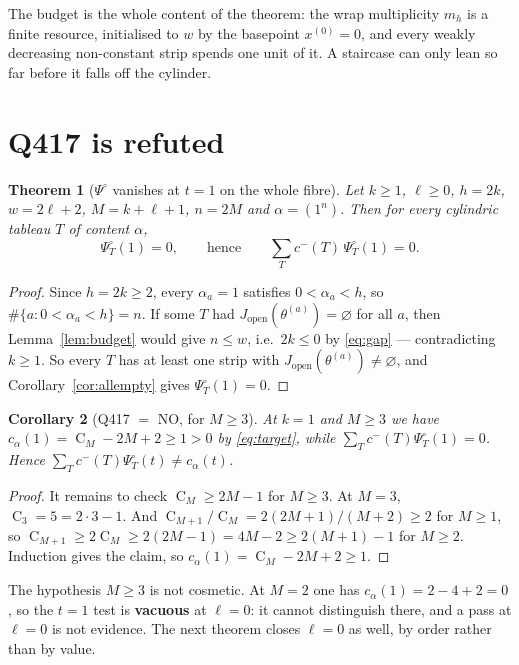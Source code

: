 \documentclass[11pt]{article}
\theoremstyle{plain}
\newtheorem{theorem}{Theorem}
\newtheorem{corollary}[theorem]{Corollary}
\theoremstyle{definition}
\newcommand{\Jop}{J_{\mathrm{open}}}
\newcommand{\Psiop}{\Psi^{\circ}}
\DeclareMathOperator{\Cat}{C}
\begin{document}
The budget is the whole content of the theorem: the wrap multiplicity $m_h$ is a finite resource,
initialised to $w$ by the basepoint $x^{(0)}=0$, and every weakly decreasing non-constant strip
spends one unit of it. A staircase can only lean so far before it falls off the cylinder.

\section{Q417 is refuted}

\begin{theorem}[$\Psiop$ vanishes at $t=1$ on the whole fibre]\label{thm:main}
Let $k\ge1$, $\ell\ge0$, $h=2k$, $w=2\ell+2$, $M=k+\ell+1$, $n=2M$ and $\alpha=(1^n)$. Then for
\emph{every} cylindric tableau $T$ of content $\alpha$,
\[
\Psiop_T(1)=0,
\qquad\text{hence}\qquad
\sum_{T}c^-(T)\,\Psiop_T(1)=0 .
\]
\end{theorem}

\begin{proof}
Since $h=2k\ge2$, every $\alpha_a=1$ satisfies $0<\alpha_a<h$, so
$\#\{a:0<\alpha_a<h\}=n$. If some $T$ had $\Jop(\theta^{(a)})=\varnothing$ for all $a$, then
Lemma~\ref{lem:budget} would give $n\le w$, i.e.\ $2k\le0$ by \eqref{eq:gap} --- contradicting
$k\ge1$. So every $T$ has at least one strip with $\Jop(\theta^{(a)})\ne\varnothing$, and
Corollary~\ref{cor:allempty} gives $\Psiop_T(1)=0$.
\end{proof}

\begin{corollary}[Q417 $=$ NO, for $M\ge3$]\label{cor:no}
At $k=1$ and $M\ge3$ we have $c_\alpha(1)=\Cat_M-2M+2\ge1>0$ by \eqref{eq:target}, while
$\sum_T c^-(T)\Psiop_T(1)=0$. Hence $\sum_T c^-(T)\Psiop_T(t)\ne c_\alpha(t)$.
\end{corollary}

\begin{proof}
It remains to check $\Cat_M\ge 2M-1$ for $M\ge3$. At $M=3$, $\Cat_3=5=2\cdot3-1$. And
$\Cat_{M+1}/\Cat_M=2(2M+1)/(M+2)\ge2$ for $M\ge1$, so $\Cat_{M+1}\ge2\Cat_M\ge2(2M-1)=4M-2\ge
2(M+1)-1$ for $M\ge2$. Induction gives the claim, so $c_\alpha(1)=\Cat_M-2M+2\ge1$.
\end{proof}

The hypothesis $M\ge3$ is not cosmetic. At $M=2$ one has $c_\alpha(1)=2-4+2=0$, so the $t=1$
test is \textbf{vacuous} at $\ell=0$: it cannot distinguish there, and a pass at $\ell=0$ is not
evidence. The next theorem closes $\ell=0$ as well, by order rather than by value.
\end{document}
